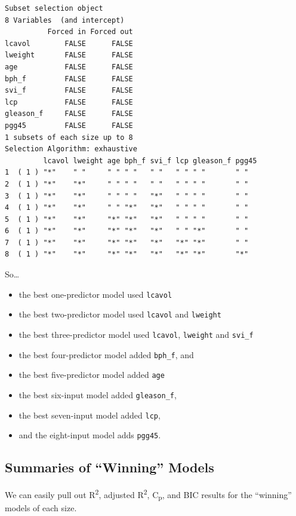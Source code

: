 \documentclass[]{book}
\providecommand{\tightlist}{%
  \setlength{\itemsep}{0pt}\setlength{\parskip}{0pt}}
\theoremstyle{definition}
\theoremstyle{definition}
\theoremstyle{definition}
\theoremstyle{remark}
\begin{document}
\begin{verbatim}
Subset selection object
8 Variables  (and intercept)
          Forced in Forced out
lcavol        FALSE      FALSE
lweight       FALSE      FALSE
age           FALSE      FALSE
bph_f         FALSE      FALSE
svi_f         FALSE      FALSE
lcp           FALSE      FALSE
gleason_f     FALSE      FALSE
pgg45         FALSE      FALSE
1 subsets of each size up to 8
Selection Algorithm: exhaustive
         lcavol lweight age bph_f svi_f lcp gleason_f pgg45
1  ( 1 ) "*"    " "     " " " "   " "   " " " "       " "  
2  ( 1 ) "*"    "*"     " " " "   " "   " " " "       " "  
3  ( 1 ) "*"    "*"     " " " "   "*"   " " " "       " "  
4  ( 1 ) "*"    "*"     " " "*"   "*"   " " " "       " "  
5  ( 1 ) "*"    "*"     "*" "*"   "*"   " " " "       " "  
6  ( 1 ) "*"    "*"     "*" "*"   "*"   " " "*"       " "  
7  ( 1 ) "*"    "*"     "*" "*"   "*"   "*" "*"       " "  
8  ( 1 ) "*"    "*"     "*" "*"   "*"   "*" "*"       "*"  
\end{verbatim}

So\ldots{}

\begin{itemize}
\tightlist
\item
  the best one-predictor model used \texttt{lcavol}
\item
  the best two-predictor model used \texttt{lcavol} and \texttt{lweight}
\item
  the best three-predictor model used \texttt{lcavol}, \texttt{lweight}
  and \texttt{svi\_f}
\item
  the best four-predictor model added \texttt{bph\_f}, and
\item
  the best five-predictor model added \texttt{age}
\item
  the best six-input model added \texttt{gleason\_f},
\item
  the best seven-input model added \texttt{lcp},
\item
  and the eight-input model adds \texttt{pgg45}.
\end{itemize}

\subsection{\texorpdfstring{Summaries of ``Winning''
Models}{Summaries of Winning Models}}\label{summaries-of-winning-models}

We can easily pull out R\textsuperscript{2}, adjusted
R\textsuperscript{2}, C\textsubscript{p}, and BIC results for the
``winning'' models of each size.
\end{document}
